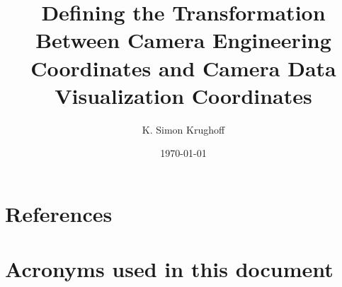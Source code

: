 \documentclass[SE,lsstdraft,toc]{lsstdoc}
\title{Defining the Transformation Between Camera Engineering Coordinates and Camera Data Visualization Coordinates}
\author{%
K. Simon Krughoff
}
\date{\today}
\begin{document}
\maketitle





\appendix
\section{References} \label{sec:bib}


\section{Acronyms used in this document}\label{sec:acronyms}

\end{document}
